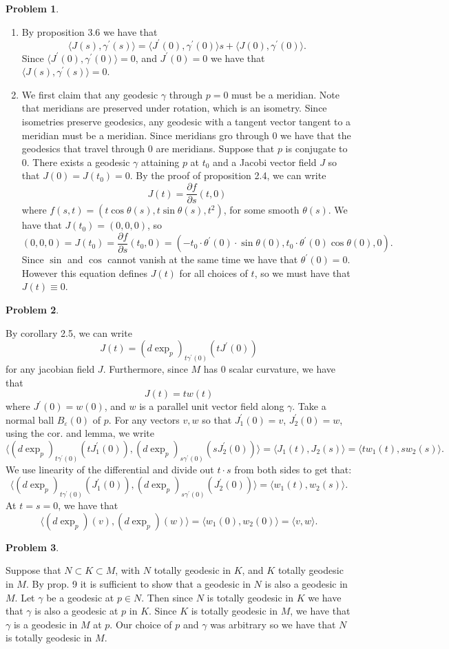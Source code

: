 \documentclass[12pt, a4paper]{article}
\title{}
\author{A.N.}
\date{\today}
\newtheorem{problem}{Problem}
\theoremstyle{definition}
\newcommand{\penum}{ \begin{enumerate}[label=\bf(\alph*), leftmargin=0pt]}
\newcommand{\epenum}{ \end{enumerate} }
\newcommand{\ep}{\varepsilon}
\newcommand{\lan}{\langle}
\newcommand{\ran}{\rangle}
\newcommand{\inn}[1]{\lan#1\ran}
\begin{document}
\begin{problem}
\end{problem}
\penum
\item By proposition 3.6 we have that 
	$$\inn{J(s), \gamma^\prime(s)} = \inn{J^\prime(0) , \gamma^\prime(0)}s + \inn{J(0), \gamma^\prime(0)}.$$
	Since $\inn{J^\prime(0) , \gamma^\prime(0)} =0$, and $J^\prime(0)=0$ we have that $\inn{J(s), \gamma^\prime(s)}=0$. 
\item We first claim that any geodesic $\gamma$ through $p=0$ must be a meridian. 
Note that meridians are preserved under rotation, which is an isometry. Since isometries preserve geodesics, any geodesic with a tangent vector tangent to a meridian must be a meridian. Since meridians gro through 0 we have that the geodesics that travel through 0 are meridians. 
Suppose that $p$ is conjugate to $0$. There exists a geodesic $\gamma$ attaining $p$ at $t_0$ and a Jacobi vector field $J$ so that $J(0) = J(t_0) = 0$. 
By the proof of proposition 2.4, we can write 
$$J(t) = \frac{\partial f}{ \partial s}(t,0)$$
where $f(s,t) = (t\cos \theta(s), t \sin \theta(s), t^2)$, for some smooth $\theta(s)$. 
We have that $J(t_0) = (0,0,0)$, so 
$$(0,0,0) = J(t_0) = \frac{\partial f}{\partial s}(t_0,0) = ( - t_0 \cdot \theta^\prime(0) \cdot \sin \theta(0), t_0 \cdot \theta^\prime(0) \cos \theta(0), 0 ). $$
Since $\sin$ and $\cos$ cannot vanish at the same time we have that $\theta^\prime(0) =0$. However this equation defines $J(t)$ for all choices of $t$, so we must have that $J(t) \equiv 0$. 
\epenum
 \newpage 
\begin{problem}
\end{problem}
By corollary 2.5, we can write 
$$J(t) = \left( d \exp_p	\right)_{t \gamma^\prime(0)} (t J^\prime(0))$$
for any jacobian field $J$. Furthermore, since $M$ has 0 scalar curvature, we have that 
$$J(t) = t w(t)$$
where $J^\prime(0) = w(0)$, and $w$ is a parallel unit vector field along $\gamma$. Take a normal ball $B_\ep(0)$ of $p$. For any vectors $v,w$ so that $J_1^\prime(0) = v$, $J_2^\prime(0) = w$, using the cor. and lemma, we write
$$\inn{\left( d \exp_p	\right)_{t \gamma^\prime(0)} (t J_1^\prime(0)), \left( d \exp_p	\right)_{s \gamma^\prime(0)} (sJ_2^\prime(0))} = \inn{J_1(t), J_2(s)} = \inn{t w_1(t) , s w_2(s)}.$$
We use linearity of the differential and divide out $t\cdot s$ from both sides to get that: 
$$\inn{\left( d \exp_p	\right)_{t \gamma^\prime(0)} ( J_1^\prime(0)), \left( d \exp_p	\right)_{s \gamma^\prime(0)} (J_2^\prime(0))} =\inn{w_1(t) , w_2(s)}.$$
At $t=s=0$, we have that 
$$\inn{\left( d \exp_p	\right) (v), \left( d \exp_p	\right) (w)} =\inn{w_1(0) , w_2(0)} = \inn{v,w}.$$
 \newpage 
\begin{problem}
\end{problem}
Suppose that $N \subset K \subset M$, with $N$ totally geodesic in $K$, and $K$ totally geodesic in $M$. By prop. 9 it is sufficient to show that a geodesic in $N$ is also a geodesic in $M$. Let $\gamma$ be a geodesic at $p \in N$. 
Then since $N$ is totally geodesic in $K$ we have that $\gamma$ is also a geodesic at $p$ in $K$. Since $K$ is totally geodesic in $M$, we have that $\gamma$ is a geodesic in $M$ at $p$. 
Our choice of $p$ and $\gamma$ was arbitrary so we have that $N$ is totally geodesic in $M$. 
\end{document}
